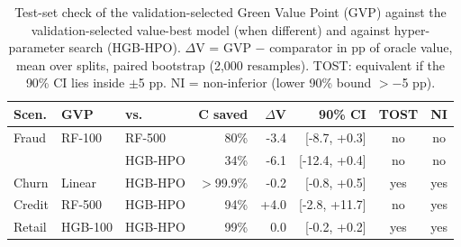 \begin{table}[t]
\centering
\caption{Test-set check of the validation-selected Green Value Point (GVP) against the validation-selected value-best model (when different) and against hyper-parameter search (HGB-HPO). $\Delta$V = GVP $-$ comparator in pp of oracle value, mean over splits, paired bootstrap (2,000 resamples). TOST: equivalent if the 90\% CI lies inside $\pm$5 pp. NI = non-inferior (lower 90\% bound $>-$5 pp).}
\label{tab:tost}
\scriptsize
\setlength{\tabcolsep}{2.2pt}
\begin{tabular}{lllrrrcc}
\toprule
Scen. & GVP & vs. & C saved & $\Delta$V & 90\% CI & TOST & NI \\ \midrule
Fraud & RF-100 & RF-500 & 80\% & -3.4 & [-8.7, +0.3] & no & no \\
 &  & HGB-HPO & 34\% & -6.1 & [-12.4, +0.4] & no & no \\
Churn & Linear & HGB-HPO & $>$99.9\% & -0.2 & [-0.8, +0.5] & yes & yes \\
Credit & RF-500 & HGB-HPO & 94\% & +4.0 & [-2.8, +11.7] & no & yes \\
Retail & HGB-100 & HGB-HPO & 99\% & 0.0 & [-0.2, +0.2] & yes & yes \\
\bottomrule
\end{tabular}
\end{table}
